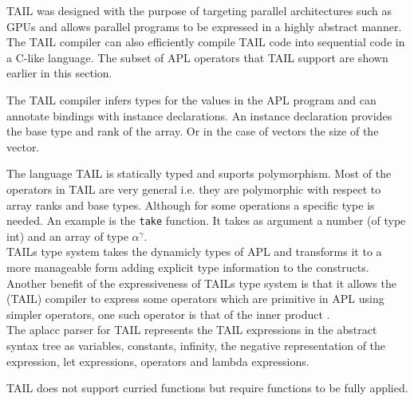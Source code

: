 \documentclass[11pt]{article}
\begin{document}
TAIL was designed with the purpose of targeting parallel architectures such as GPUs and allows parallel programs to be
expressed in a highly abstract manner.
The TAIL compiler can also efficiently compile TAIL code into sequential code in a C-like language.
The subset of APL operators that TAIL support are shown earlier in this section.

The TAIL compiler infers types for the values in the APL program and can annotate bindings with
instance declarations. An instance declaration provides the base type and rank of the array. Or in
the case of vectors the size of the vector.

The language TAIL is statically typed and suports polymorphism. 
Most of the operators in TAIL are very general i.e. they are polymorphic with respect to array ranks and base types.
Although for some operations a specific type is needed.
An example is the {\tt take} function. It takes as argument a number (of type int) and an array of type $\alpha^\gamma$.\\

 TAILs type system takes the dynamicly types of APL and transforms it to a more manageable form adding explicit type
 information to the constructs.
Another benefit of the expressiveness of TAILs type system is that it allows the (TAIL) compiler to express some operators which
are primitive in APL using simpler operators, one such operator is that of the inner product \cite{ElsmanDybdal:Array:2014}. \\

The aplacc parser for TAIL represents the TAIL expressions in the abstract syntax tree as variables, constants, infinity, the negative representation of 
the expression, let expressions, operators and lambda expressions. 

TAIL does not support curried functions but require functions to be fully applied.


\end{document}
